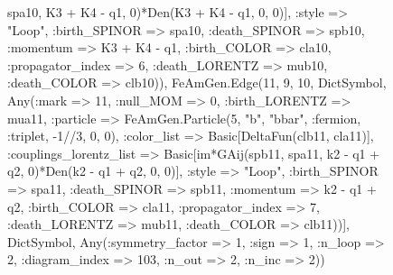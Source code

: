 \documentclass{revtex4}
\begin{document}
\begin{figure}[!htb]
\begin{center}
{spa10, K3 + K4 - q1, 0)*Den(K3 + K4 - q1, 0, 0)], :style => "Loop", :birth_SPINOR => spa10, :death_SPINOR => spb10, :momentum => K3 + K4 - q1, :birth_COLOR => cla10, :propagator_index => 6, :death_LORENTZ => mub10, :death_COLOR => clb10)), FeAmGen.Edge(11, 9, 10, Dict{Symbol, Any}(:mark => 11, :null_MOM => 0, :birth_LORENTZ => mua11, :particle => FeAmGen.Particle(5, "b", "bbar", :fermion, :triplet, -1//3, 0, 0), :color_list => Basic[DeltaFun(clb11, cla11)], :couplings_lorentz_list => Basic[im*GAij(spb11, spa11, k2 - q1 + q2, 0)*Den(k2 - q1 + q2, 0, 0)], :style => "Loop", :birth_SPINOR => spa11, :death_SPINOR => spb11, :momentum => k2 - q1 + q2, :birth_COLOR => cla11, :propagator_index => 7, :death_LORENTZ => mub11, :death_COLOR => clb11))], Dict{Symbol, Any}(:symmetry_factor => 1, :sign => 1, :n_loop => 2, :diagram_index => 103, :n_out => 2, :n_inc => 2)) 
}
\end{center}
\end{figure}
\end{document}
